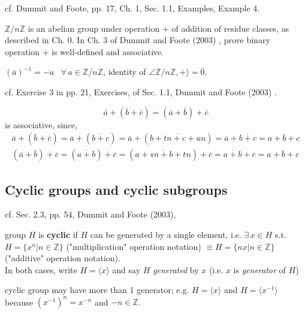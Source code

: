 cf. Dummit and Foote, pp. 17, Ch. 1, Sec. 1.1, Examples, Example 4.

$\mathbb{Z}/n\mathbb{Z}$ is an abelian group under operation $+$ of addition of residue classes, as described in Ch. 0. In Ch. 3 of Dummit and Foote (2003) \cite{agat:DuFo2003}, prove binary operation $+$ is well-defined and associative.

$(\overline{a})^{-1} = \overline{-a}$ \, $\forall \, a \in \mathbb{Z}/ n \mathbb{Z}$, identity of $\angle \mathbb{Z}/n\mathbb{Z}, + \rangle = \overline{0}$.

 cf. Exercise 3 in pp. 21, Exercises, of Sec. 1.1, Dummit and Foote (2003) \cite{agat:DuFo2003}. 

\[
\overline{a}  + (\overline{b} + \overline{c}) = (\overline{a} + \overline{b}) + \overline{c} 
\]
is associative, since,
\[
\begin{gathered}
\overline{a} + (\overline{b} + \overline{c}) = \overline{a} + (\overline{b+c}) = \overline{a} + (\overline{b + tn + c + un}) = \overline{a} + \overline{b+c} = \overline{a+b+c} \\
(\overline{a} + \overline{b}) + \overline{c} = (\overline{a+b}) + \overline{c} = (\overline{a + sn + b+ tn}) + \overline{c} = \overline{a+b} + \overline{c} = \overline{a+b+c}
\end{gathered}
\]

\subsection{Cyclic groups and cyclic subgroups}

cf. Sec. 2.3, pp. 54, Dummit and Foote (2003), \cite{agat:DuFo2003}

\begin{definition}\label{agat:Def:CyclicGroup}
	group $H$ is \textbf{cyclic} if $H$ can be generated by a single element, i.e. $\exists \, x \in H$ s.t. $H= \lbrace x^n | n\in \mathbb{Z} \rbrace$ ("multiplication" operation notation) $\equiv H = \lbrace nx | n \in \mathbb{Z} \rbrace$ ("additive" operation notation). \\
	
	In both cases, write $H = \langle x \rangle$ and say $H$ \emph{generated} by $x$ (i.e. $x$ is \emph{generator} of $H$)
\end{definition}
	cyclic group may have more than 1 generator; e.g. $H = \langle x \rangle$ and $H = \langle x^{-1} \rangle$ because $(x^{-1})^n = x^{-n}$ and $-n \in \mathbb{Z}$. 
	
